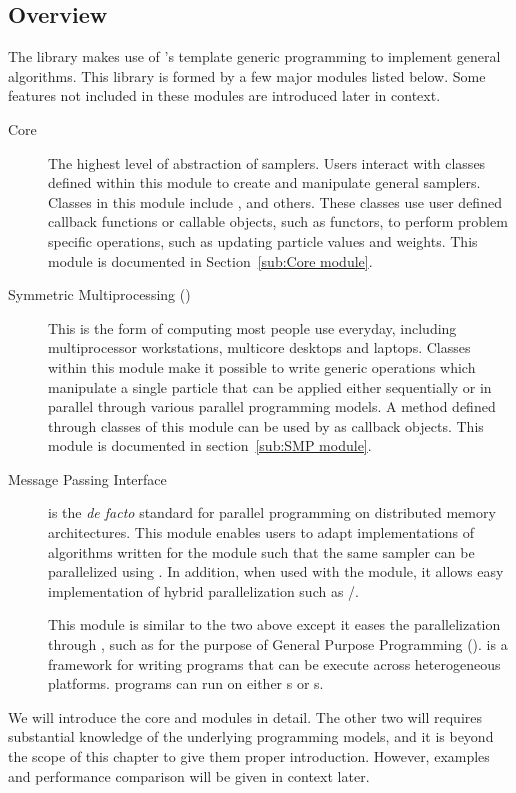 \subsection{Overview}

The \vsmc library makes use of \cpp's template generic programming to
implement general \smc algorithms. This library is formed by a few major
modules listed below. Some features not included in these modules are
introduced later in context.
\begin{description}
  \item[Core] The highest level of abstraction of \smc samplers. Users
    interact with classes defined within this module to create and manipulate
    general \smc samplers. Classes in this module include ,
     and others. These classes use user defined callback
    functions or callable objects, such as functors, to perform problem
    specific operations, such as updating particle values and weights. This
    module is documented in Section~\ref{sub:Core module}.
  \item[Symmetric Multiprocessing (\smp)] This is the form of computing most
    people use everyday, including multiprocessor workstations, multicore
    desktops and laptops. Classes within this module make it possible to write
    generic operations which manipulate a single particle that can be applied
    either sequentially or in parallel through various parallel programming
    models. A method defined through classes of this module can be used by
     as callback objects. This module is documented in
    section~\ref{sub:SMP module}.
  \item[Message Passing Interface] \mpi is the \emph{de facto} standard
    for parallel programming on distributed memory architectures. This module
    enables users to adapt implementations of algorithms written for the \smp
    module such that the same sampler can be parallelized using \mpi. In
    addition, when used with the \smp module, it allows easy implementation of
    hybrid parallelization such as \mpi/\openmp.
  \item[\opencl] This module is similar to the two above except it eases the
    parallelization through \opencl, such as for the purpose of General
    Purpose \gpu Programming (\gpgpu). \opencl is a framework for writing
    programs that can be execute across heterogeneous platforms. \opencl
    programs can run on either \cpu{}s or \gpu{}s.
\end{description}
We will introduce the core and \smp modules in detail. The other two will
requires substantial knowledge of the underlying programming models, and it is
beyond the scope of this chapter to give them proper introduction. However,
examples and performance comparison will be given in context later.

